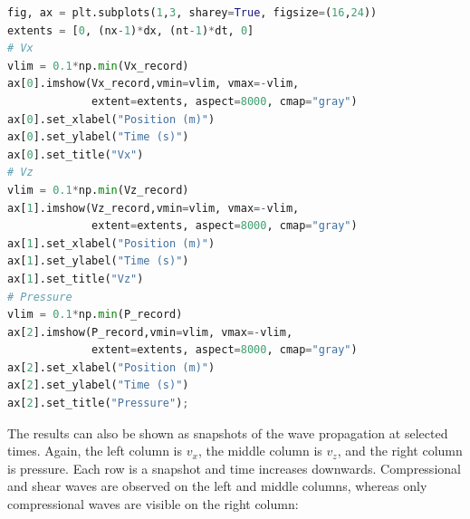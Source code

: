\documentclass[a4paper , 12pt]{book}
\begin{document}
\begin{center}
\begin{lstlisting}[language=Python, frame=single]
fig, ax = plt.subplots(1,3, sharey=True, figsize=(16,24))
extents = [0, (nx-1)*dx, (nt-1)*dt, 0]
# Vx
vlim = 0.1*np.min(Vx_record)
ax[0].imshow(Vx_record,vmin=vlim, vmax=-vlim, 
             extent=extents, aspect=8000, cmap="gray")
ax[0].set_xlabel("Position (m)")
ax[0].set_ylabel("Time (s)")
ax[0].set_title("Vx")
# Vz
vlim = 0.1*np.min(Vz_record)
ax[1].imshow(Vz_record,vmin=vlim, vmax=-vlim, 
             extent=extents, aspect=8000, cmap="gray")
ax[1].set_xlabel("Position (m)")
ax[1].set_ylabel("Time (s)")
ax[1].set_title("Vz")
# Pressure
vlim = 0.1*np.min(P_record)
ax[2].imshow(P_record,vmin=vlim, vmax=-vlim, 
             extent=extents, aspect=8000, cmap="gray")
ax[2].set_xlabel("Position (m)")
ax[2].set_ylabel("Time (s)")
ax[2].set_title("Pressure");
\end{lstlisting}
\end{center} 

The results can also be shown as snapshots of the wave propagation at selected times. Again, the left column is $v_x$, the middle column is $v_z$, and the right column is pressure. Each row is a snapshot and time increases downwards. Compressional and shear waves are observed on the left and middle columns, whereas only compressional waves are visible on the right column:
\end{document}
